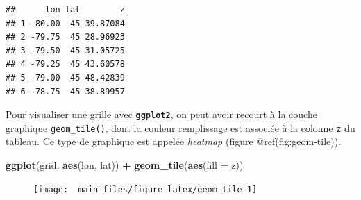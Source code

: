 \documentclass[]{book}
\newenvironment{Shaded}{\begin{snugshade}}{\end{snugshade}}
\newcommand{\CommentTok}[1]{\textcolor[rgb]{0.56,0.35,0.01}{\textit{#1}}}
\newcommand{\DataTypeTok}[1]{\textcolor[rgb]{0.13,0.29,0.53}{#1}}
\newcommand{\DecValTok}[1]{\textcolor[rgb]{0.00,0.00,0.81}{#1}}
\newcommand{\FloatTok}[1]{\textcolor[rgb]{0.00,0.00,0.81}{#1}}
\newcommand{\KeywordTok}[1]{\textcolor[rgb]{0.13,0.29,0.53}{\textbf{#1}}}
\newcommand{\NormalTok}[1]{#1}
\newcommand{\OperatorTok}[1]{\textcolor[rgb]{0.81,0.36,0.00}{\textbf{#1}}}
\newcommand{\StringTok}[1]{\textcolor[rgb]{0.31,0.60,0.02}{#1}}
\begin{document}
\begin{Shaded}
\end{Shaded}

\begin{verbatim}
##      lon lat        z
## 1 -80.00  45 39.87084
## 2 -79.75  45 28.96923
## 3 -79.50  45 31.05725
## 4 -79.25  45 43.60578
## 5 -79.00  45 48.42839
## 6 -78.75  45 38.89957
\end{verbatim}

Pour visualiser une grille avec \textbf{\texttt{ggplot2}}, on peut avoir
recourt à la couche graphique \texttt{geom\_tile()}, dont la couleur
remplissage est associée à la colonne \texttt{z} du tableau. Ce type de
graphique est appelée \emph{heatmap} (figure @ref(fig:geom-tile)).

\begin{Shaded}
\begin{Highlighting}[]
\KeywordTok{ggplot}\NormalTok{(grid, }\KeywordTok{aes}\NormalTok{(lon, lat)) }\OperatorTok{+}
\StringTok{  }\KeywordTok{geom_tile}\NormalTok{(}\KeywordTok{aes}\NormalTok{(}\DataTypeTok{fill =}\NormalTok{ z))}
\end{Highlighting}
\end{Shaded}

\begin{figure}

{\centering \texttt{[image: \_main\_files/figure-latex/geom-tile-1]} 

}

\caption{ }\label{fig:geom-tile}
\end{figure}
\end{document}
